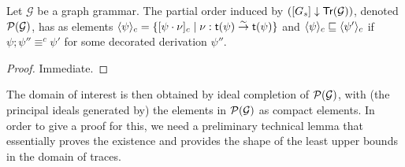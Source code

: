 \begin{lemma}
\label{le:partial_order_gg}
  Let $\mathcal{G}$ be a graph grammar. The partial order induced by
  $({[G_s]} \downarrow {\ensuremath{\mathsf{Tr}({\mathcal{G}})}})$, denoted $\mathcal{P}({\mathcal{G}})$,
  has as elements
  $\langle {\psi}\rangle_c = \{ [\psi \cdot \nu]_c \mid \nu : \mathsf{t}({\psi})
  \stackrel{\sim}{\to} \mathsf{t}({\psi}) \}$ and
  $\langle {\psi}\rangle_c \sqsubseteq \langle {\psi'}\rangle_c$ if
  $\psi;\psi'' \equiv^c \psi'$ for some decorated derivation $\psi''$.
%
%  
\end{lemma}

\begin{proof}
  Immediate.
\end{proof}



The domain of interest is then obtained by ideal completion of
$\mathcal{P}({\mathcal{G}})$, with (the principal ideals generated by) the elements in
$\mathcal{P}({\mathcal{G}})$ as compact elements.
%
In order to give a proof for this, we need a preliminary technical lemma that
essentially proves the existence and provides the shape of the least 
upper bounds in the domain of traces.

